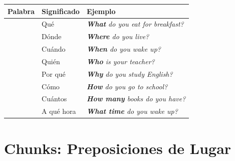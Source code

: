 \documentclass[12pt,a4paper]{article}
\begin{document}
\begin{cajachunk}
\begin{tabularx}{\textwidth}{@{} l l X @{}}
\toprule
\textbf{Palabra} & \textbf{Significado} & \textbf{Ejemplo} \\
\midrule
\eng{What} & Qué & \textit{\textbf{What} do you eat for breakfast?} \\
\eng{Where} & Dónde & \textit{\textbf{Where} do you live?} \\
\eng{When} & Cuándo & \textit{\textbf{When} do you wake up?} \\
\eng{Who} & Quién & \textit{\textbf{Who} is your teacher?} \\
\eng{Why} & Por qué & \textit{\textbf{Why} do you study English?} \\
\eng{How} & Cómo & \textit{\textbf{How} do you go to school?} \\
\eng{How many} & Cuántos & \textit{\textbf{How many} books do you have?} \\
\eng{What time} & A qué hora & \textit{\textbf{What time} do you wake up?} \\
\bottomrule
\end{tabularx}
\end{cajachunk}

\section{Chunks: Preposiciones de Lugar}
\end{document}
